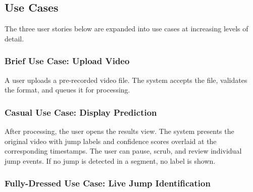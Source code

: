 \subsection{Use Cases}

The three user stories below are expanded into use cases at increasing
levels of detail.

\subsubsection*{Brief Use Case: Upload Video}

A user uploads a pre-recorded video file. The system accepts the file,
validates the format, and queues it for processing.

\subsubsection*{Casual Use Case: Display Prediction}

After processing, the user opens the results view. The system presents
the original video with jump labels and confidence scores overlaid at
the corresponding timestamps. The user can pause, scrub, and review
individual jump events. If no jump is detected in a segment, no label
is shown.

\subsubsection*{Fully-Dressed Use Case: Live Jump Identification}

